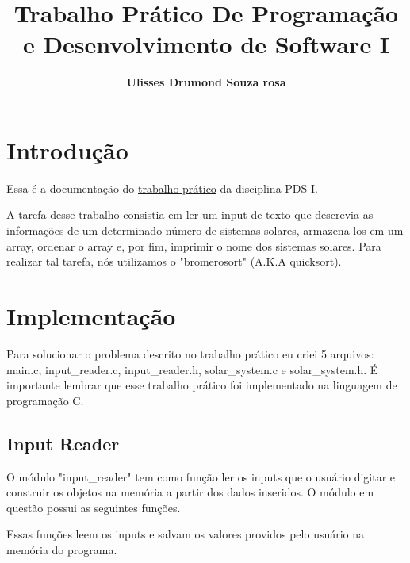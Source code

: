 \documentclass[11pt]{article}
\title{\textbf{Trabalho Prático De Programação e Desenvolvimento de Software I}}
\author{\textbf{Ulisses Drumond Souza rosa}}
\date{\parbox{\linewidth}{\centering%
    Universidade Federal de Minas Gerais (UFMG)\endgraf
    Belo Horizonte - MG - Brasil\endgraf\bigskip
    \href{mailto:email@ufmg.br}{ulissao@proton.me}}}
\begin{document}
\maketitle


\section{Introdução}

    \par Essa é a documentação do \href{https://github.com/ullas-college-projects/Pds1-pratical-work}{trabalho prático} da disciplina PDS I. 
    \par A tarefa desse trabalho consistia em ler um input de texto que descrevia as informações de um determinado número de sistemas solares, armazena-los em um array, ordenar o array e, por fim, imprimir o nome dos sistemas solares. Para realizar tal tarefa, nós utilizamos o "bromerosort" (A.K.A quicksort).


\section{Implementação}

    \par Para solucionar o problema descrito no trabalho prático eu criei 5 arquivos: main.c, input\_reader.c, input\_reader.h, solar\_system.c e solar\_system.h. É importante lembrar que esse trabalho prático foi implementado na linguagem de programação C. 

    \subsection{Input Reader}
        \par O módulo "input\_reader" tem como função ler os inputs que o usuário digitar e construir os objetos na memória a partir dos dados inseridos. O módulo em questão possui as seguintes funções.

        \par
        

        \par Essas funções leem os inputs e salvam os valores providos pelo usuário na memória do programa.
\end{document}
